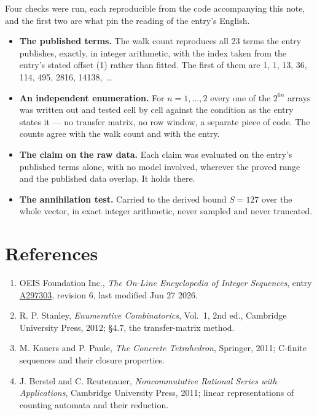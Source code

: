 \documentclass[11pt]{article}
\theoremstyle{definition}
\begin{document}
Four checks were run, each reproducible from the code accompanying this note, and the first two are what pin the reading of the entry's English.

\begin{itemize}

\item {\bfseries The published terms.} The walk count reproduces all 23 terms the entry publishes, exactly, in integer arithmetic, with the index taken from the entry's stated offset (1) rather than fitted. The first of them are 1, 1, 13, 36, 114, 495, 2816, 14138,~\dots

\item {\bfseries An independent enumeration.} For $n = 1,\dots,2$ every one of the $2^{6n}$ arrays was written out and tested cell by cell against the condition as the entry states it --- no transfer matrix, no row window, a separate piece of code. The counts agree with the walk count and with the entry.

\item {\bfseries The claim on the raw data.} Each claim was evaluated on the entry's published terms alone, with no model involved, wherever the proved range and the published data overlap. It holds there.

\item {\bfseries The annihilation test.} Carried to the derived bound $S = 127$ over the whole vector, in exact integer arithmetic, never sampled and never truncated.

\end{itemize}

\section{References}

\begin{enumerate}

\item OEIS Foundation Inc., \emph{The On-Line Encyclopedia of Integer Sequences}, entry \href{https://oeis.org/A297303}{A297303}, revision 6, last modified Jun 27 2026.

\item R. P. Stanley, \emph{Enumerative Combinatorics}, Vol.~1, 2nd ed., Cambridge University Press, 2012; \S4.7, the transfer-matrix method.

\item M. Kauers and P. Paule, \emph{The Concrete Tetrahedron}, Springer, 2011; C-finite sequences and their closure properties.

\item J. Berstel and C. Reutenauer, \emph{Noncommutative Rational Series with Applications}, Cambridge University Press, 2011; linear representations of counting automata and their reduction.

\end{enumerate}
\end{document}
